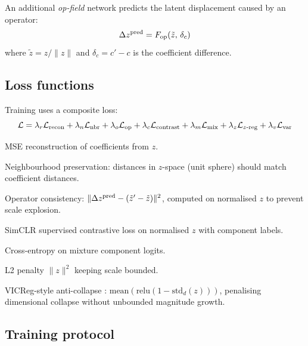 \documentclass[11pt,a4paper]{article}
\begin{document}
An additional \emph{op-field} network predicts the latent displacement caused
by an operator:
\[
  \Delta z^{\rm pred} = F_{\rm op}(\tilde{z},\, \delta_c)
\]
where $\tilde{z} = z / \|z\|$ and $\delta_c = c' - c$ is the coefficient
difference.

\subsection{Loss functions}

Training uses a composite loss:
\begin{equation}
  \mathcal{L} = \lambda_r \mathcal{L}_{\rm recon}
    + \lambda_n \mathcal{L}_{\rm nbr}
    + \lambda_o \mathcal{L}_{\rm op}
    + \lambda_c \mathcal{L}_{\rm contrast}
    + \lambda_m \mathcal{L}_{\rm mix}
    + \lambda_z \mathcal{L}_{z\text{-reg}}
    + \lambda_v \mathcal{L}_{\rm var}
\end{equation}

\begin{description}[noitemsep]
  \item[$\mathcal{L}_{\rm recon}$] MSE reconstruction of coefficients from $z$.
  \item[$\mathcal{L}_{\rm nbr}$] Neighbourhood preservation: distances in
        $z$-space (unit sphere) should match coefficient distances.
  \item[$\mathcal{L}_{\rm op}$] Operator consistency:
        $\|\Delta z^{\rm pred} - (\tilde{z}' - \tilde{z})\|^2$,
        computed on normalised $z$ to prevent scale explosion.
  \item[$\mathcal{L}_{\rm contrast}$] SimCLR supervised contrastive loss
        \cite{khosla2020supervised} on normalised $z$ with component labels.
  \item[$\mathcal{L}_{\rm mix}$] Cross-entropy on mixture component logits.
  \item[$\mathcal{L}_{z\text{-reg}}$] L2 penalty $\|z\|^2$ keeping scale bounded.
  \item[$\mathcal{L}_{\rm var}$] VICReg-style anti-collapse
        \cite{bardes2022vicreg}: $\text{mean}(\text{relu}(1 - \text{std}_d(z)))$,
        penalising dimensional collapse without unbounded magnitude growth.
\end{description}

\subsection{Training protocol}
\end{document}
